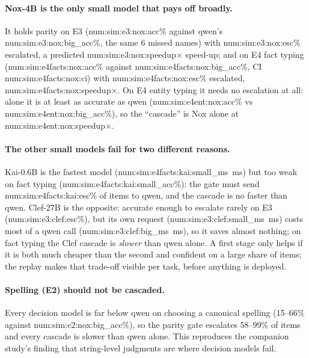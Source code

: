 \documentclass[11pt]{article}
\newcommand{\N}[1]{\csname num:#1\endcsname}
\begin{document}
\begin{table}[t]
\centering
\small

\caption{Replay-model predictions for every decision model in front of qwen (reasoning off), with the
held-out parity gate. ``Esc.''\ is the share of items sent to qwen. Mean latency is per item,
single-stream. For E3 the cascade column also gives missed real names (cascade/qwen) out of 84.
CIs are paired bootstrap over items. The speed-up is qwen's mean single-stream latency on the same
items divided by the cascade's.}
\label{tab:design}
\end{table}

\paragraph{Nox-4B is the only small model that pays off broadly.} It holds parity on E3
(\N{sim:e3:nox:acc}\% against qwen's \N{sim:e3:nox:big_acc}\%, the same 6 missed names) with
\N{sim:e3:nox:esc}\% escalated, a predicted \N{sim:e3:nox:speedup}$\times$ speed-up; and on E4 fact
typing (\N{sim:e4facts:nox:acc}\% against \N{sim:e4facts:nox:big_acc}\%, CI \N{sim:e4facts:nox:ci})
with \N{sim:e4facts:nox:esc}\% escalated, \N{sim:e4facts:nox:speedup}$\times$. On E4 entity typing it
needs no escalation at all: alone it is at least as accurate as qwen (\N{sim:e4ent:nox:acc}\% vs
\N{sim:e4ent:nox:big_acc}\%), so the ``cascade'' is Nox alone at \N{sim:e4ent:nox:speedup}$\times$.

\paragraph{The other small models fail for two different reasons.} Kai-0.6B is the fastest model
(\N{sim:e4facts:kai:small_ms}~ms) but too weak on fact typing (\N{sim:e4facts:kai:small_acc}\%): the
gate must send \N{sim:e4facts:kai:esc}\% of items to qwen, and the cascade is no faster than qwen.
Clef-27B is the opposite: accurate enough to escalate rarely on E3 (\N{sim:e3:clef:esc}\%), but its
own request (\N{sim:e3:clef:small_ms}~ms) costs most of a qwen call (\N{sim:e3:clef:big_ms}~ms), so it
saves almost nothing; on fact typing the Clef cascade is \emph{slower} than qwen alone. A first
stage only helps if it is both much cheaper than the second and confident on a large share of
items; the replay makes that trade-off visible per task, before anything is deployed.

\paragraph{Spelling (E2) should not be cascaded.} Every decision model is far below qwen on choosing
a canonical spelling (15--66\% against \N{sim:e2:nox:big_acc}\%), so the parity gate escalates
58--99\% of items and every cascade is slower than qwen alone. This reproduces the companion
study's finding that string-level judgments are where decision models fail.
\end{document}
